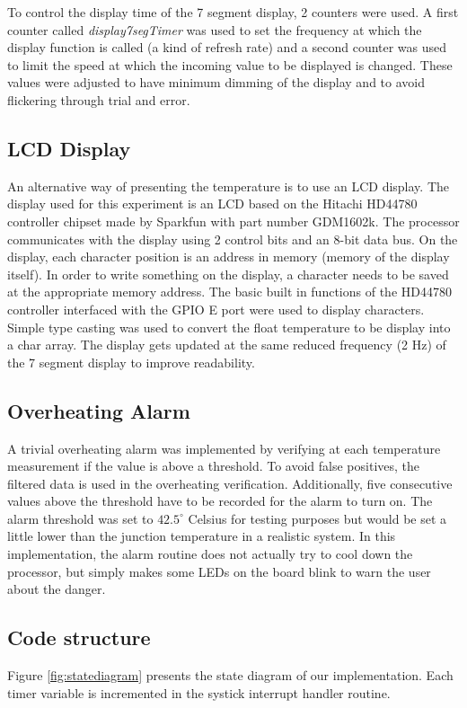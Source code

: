 \documentclass[12pt]{article}
\begin{document}
To control the display time of the 7 segment display, 2 counters were used. A first counter called \textit{display7segTimer} was used to set the frequency at which the display function is called (a kind of refresh rate) and a second counter was used to limit the speed at which the incoming value to be displayed is changed. These values were adjusted to have minimum dimming of the display and to avoid flickering through trial and error.

\subsection{LCD Display}
\label{LCD_dis}
An alternative way of presenting the temperature is to use an LCD display. The display used for this experiment is an LCD based on  the  Hitachi  HD44780  controller  chipset made by Sparkfun with part number GDM1602k. The processor communicates with the display using 2 control bits and an 8-bit data bus. On the display, each character position is an address in memory (memory of the display itself). In order to write something on the display, a character needs to be saved at the appropriate memory address. The basic built in functions of the HD44780 controller interfaced with the GPIO E port were used to display characters. Simple type casting was used to convert the float temperature to be display into a char array. The display gets updated at the same reduced frequency (2 Hz) of the 7 segment display to improve readability. 

\subsection{Overheating Alarm}
A trivial overheating alarm was implemented by verifying at each temperature measurement if the value is above a threshold. To avoid false positives, the filtered data is used in the overheating verification. Additionally, five consecutive values above the threshold have to be recorded for the alarm to turn on. The alarm threshold was set to $42.5^\circ$ Celsius for testing purposes but would be set a little lower than the junction temperature in a realistic system. In this implementation, the alarm routine does not actually try to cool down the processor, but simply makes some LEDs on the board blink to warn the user about the danger.

\subsection{Code structure}
 Figure \ref{fig:statediagram} presents the state diagram of our implementation. Each timer variable is incremented in the systick interrupt handler routine.
\end{document}
